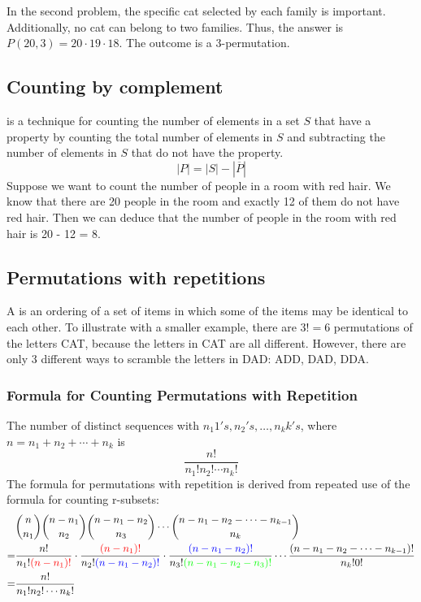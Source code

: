 In the second problem, the specific cat selected by each family is important. Additionally, no cat can belong to two families. Thus, the answer is $P(20,3) = 20 \cdot 19 \cdot 18$. The outcome is a 3-permutation.

\subsection{Counting by complement}
 is a technique for counting the number of elements in a set $S$ that have a property by counting the total number of elements in $S$ and subtracting the number of elements in $S$ that do not have the property.
\[
  |P| = |S| - |\overline{P}|
\]
Suppose we want to count the number of people in a room with red hair. We know that there are 20 people in the room and exactly 12 of them do not have red hair. Then we can deduce that the number of people in the room with red hair is 20 - 12 = 8.

\subsection{Permutations with repetitions}
A  is an ordering of a set of items in which some of the items may be identical to each other. To illustrate with a smaller example, there are $3! = 6$ permutations of the letters CAT, because the letters in CAT are all different. However, there are only 3 different ways to scramble the letters in DAD: ADD, DAD, DDA.

\subsubsection*{Formula for Counting Permutations with Repetition}
The number of distinct sequences with $n_1 1's, n_2's, \ldots, n_k k's$, where $n = n_1 + n_2 + \cdots + n_k$ is
\[
  \frac{n!}{n_1!n_2!\cdots n_k!}
\]
The formula for permutations with repetition is derived from repeated use of the formula for counting r-subsets:
\begin{align*}
    & \binom{n}{n_1} \binom{n-n_1}{n_2} \binom{n-n_1-n_2}{n_3} \cdots \binom{n-n_1-n_2-\cdots-n_{k-1}}{n_k}                                                                                                                                \\
  = & \frac{n!}{n_1!{\color{red}(n-n_1)!}} \cdot \frac{{\color{red}(n-n_1)!}}{n_2!{\color{blue}(n-n_1-n_2)!}} \cdot \frac{\color{blue}(n-n_1-n_2)!}{n_3!{\color{green}(n-n_1-n_2-n_3)!}} \cdots \frac{(n-n_1-n_2-\cdots-n_{k-1})!}{n_k!0!} \\
  = & \frac{n!}{n_1!n_2!\cdots n_k!}
\end{align*}

